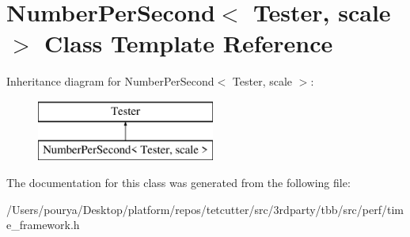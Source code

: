 \hypertarget{classNumberPerSecond}{}\section{Number\+Per\+Second$<$ Tester, scale $>$ Class Template Reference}
\label{classNumberPerSecond}
Inheritance diagram for Number\+Per\+Second$<$ Tester, scale $>$\+:\begin{figure}[H]
\begin{center}
\leavevmode
\includegraphics[height=2.000000cm]{classNumberPerSecond}
\end{center}
\end{figure}


The documentation for this class was generated from the following file\+:\begin{DoxyCompactItemize}
\item 
/\+Users/pourya/\+Desktop/platform/repos/tetcutter/src/3rdparty/tbb/src/perf/time\+\_\+framework.\+h\end{DoxyCompactItemize}
